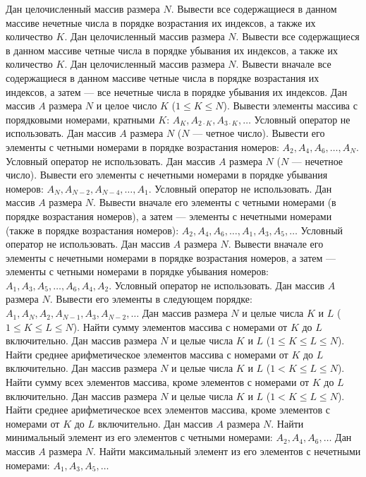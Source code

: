 Дан целочисленный массив размера $N$. Вывести все содержащиеся в данном массиве нечетные числа в порядке возрастания их индексов, а также их количество $K$.
Дан целочисленный массив размера $N$. Вывести все содержащиеся в данном массиве четные числа в порядке убывания их индексов, а также их количество $K$.
Дан целочисленный массив размера $N$. Вывести вначале все содержащиеся в данном массиве четные числа в порядке возрастания их индексов, а затем --- все нечетные числа в порядке убывания их индексов.
Дан массив $A$ размера $N$ и целое число $K$ ($1 \leq K \leq N$). Вывести элементы массива с порядковыми номерами, кратными $K$: $A_K, A_{2 \cdot K}, A_{3 \cdot K}, \dots$ Условный оператор не использовать.
Дан массив $A$ размера $N$ ($N$ --- четное число). Вывести его элементы с четными номерами в порядке возрастания номеров: $A_2, A_4, A_6, \dots, A_N$. Условный оператор не использовать.
Дан массив $A$ размера $N$ ($N$ --- нечетное число). Вывести его элементы с нечетными номерами в порядке убывания номеров: $A_N, A_{N - 2}, A_{N - 4}, \dots, A_1$. Условный оператор не использовать.
Дан массив $A$ размера $N$. Вывести вначале его элементы с четными номерами (в порядке возрастания номеров), а затем --- элементы с нечетными номерами (также в порядке возрастания номеров): $A_2, A_4, A_6, \dots, A_1, A_3, A_5, \dots$ Условный оператор не использовать.
Дан массив $A$ размера $N$. Вывести вначале его элементы с нечетными номерами в порядке возрастания номеров, а затем --- элементы с четными номерами в порядке убывания номеров: $A_1, A_3, A_5, \dots, A_6, A_4, A_2$. Условный оператор не использовать.
Дан массив $A$ размера $N$. Вывести его элементы в следующем порядке: $A_1, A_N, A_2, A_{N - 1}, A_3, A_{N - 2}, \dots$
Дан массив размера $N$ и целые числа $K$ и $L$ ($1 \leq K \leq L \leq N$). Найти сумму элементов массива с номерами от $K$ до $L$ включительно.
Дан массив размера $N$ и целые числа $K$ и $L$ ($1 \leq K \leq L \leq N$). Найти среднее арифметическое элементов массива с номерами от $K$ до $L$ включительно.
Дан массив размера $N$ и целые числа $K$ и $L$ ($1 < K \leq L \leq N$). Найти сумму всех элементов массива, кроме элементов с номерами от $K$ до $L$ включительно.
Дан массив размера $N$ и целые числа $K$ и $L$ ($1 < K \leq L \leq N$). Найти среднее арифметическое всех элементов массива, кроме элементов с номерами от $K$ до $L$ включительно.
Дан массив $A$ размера $N$. Найти минимальный элемент из его элементов с четными номерами: $A_2, A_4, A_6, \dots$
Дан массив $A$ размера $N$. Найти максимальный элемент из его элементов с нечетными номерами: $A_1, A_3, A_5, \dots$
